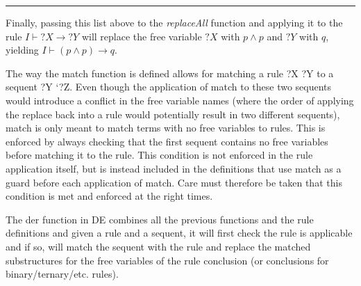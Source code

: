 \begin{center}\rule{3in}{0.4pt}\end{center}

Finally, passing this list above to the \emph{replaceAll} function and
applying it to the rule $I \vdash ?X \rightarrow ?Y$ will replace the
free variable $?X$ with $p \land p$ and $?Y$ with $q$, yielding
$I \vdash (p \land p) \rightarrow q$.

The way the match function is defined allows for matching a rule ?X ?Y
to a sequent ?Y `?Z. Even though the application of match to these two
sequents would introduce a conflict in the free variable names (where
the order of applying the replace back into a rule would potentially
result in two different sequents), match is only meant to match terms
with no free variables to rules. This is enforced by always checking
that the first sequent contains no free variables before matching it to
the rule. This condition is not enforced in the rule application itself,
but is instead included in the definitions that use match as a guard
before each application of match. Care must therefore be taken that this
condition is met and enforced at the right times.

The der function in DE combines all the previous functions and the rule
definitions and given a rule and a sequent, it will first check the rule
is applicable and if so, will match the sequent with the rule and
replace the matched substructures for the free variables of the rule
conclusion (or conclusions for binary/ternary/etc. rules).
